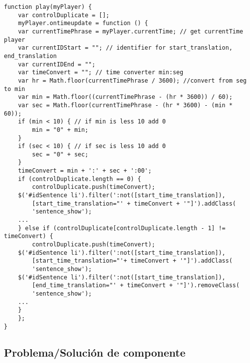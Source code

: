 \begin{itemize}
\begin{lstlisting}[caption={Control de mostrar/ocultar subtitulado.}]
function play(myPlayer) {
    var controlDuplicate = [];
    myPlayer.ontimeupdate = function () {
    var currentTimePhrase = myPlayer.currentTime; // get currentTime player
    var currentIDStart = ""; // identifier for start_translation, end_translation
    var currentIDEnd = "";
    var timeConvert = ""; // time converter min:seg
    var hr = Math.floor(currentTimePhrase / 3600); //convert from seg to min
    var min = Math.floor((currentTimePhrase - (hr * 3600)) / 60);
    var sec = Math.floor(currentTimePhrase - (hr * 3600) - (min * 60));
    if (min < 10) { // if min is less 10 add 0
        min = "0" + min;
    }
    if (sec < 10) { // if sec is less 10 add 0
        sec = "0" + sec;
    }
    timeConvert = min + ':' + sec + ':00';
    if (controlDuplicate.length == 0) {
        controlDuplicate.push(timeConvert);
    $('#idSentence li').filter(':not([start_time_translation]),
        [start_time_translation="' + timeConvert + '"]').addClass(
        'sentence_show');
    ...
    } else if (controlDuplicate[controlDuplicate.length - 1] != timeConvert) {
        controlDuplicate.push(timeConvert);
    $('#idSentence li').filter(':not([start_time_translation]),
        [start_time_translation="'+ timeConvert + '"]').addClass(
        'sentence_show');
    $('#idSentence li').filter(':not([start_time_translation]),
        [end_time_translation="' + timeConvert + '"]').removeClass(
        'sentence_show');
    ...
    }
    };
}
\end{lstlisting}

\end{itemize}

\subsection{Problema/Solución de componente}

